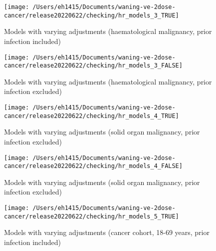 \documentclass[
  10,
]{article}
\begin{document}
\begin{landscape}
\begin{figure}[H]
{\centering \texttt{[image: /Users/eh1415/Documents/waning-ve-2dose-cancer/release20220622/checking/hr\_models\_3\_TRUE]} 

}

\caption{Models with varying adjustments (haematological malignancy, prior infection included)}\label{fig:unnamed-chunk-6}
\end{figure}

\begin{figure}[H]

{\centering \texttt{[image: /Users/eh1415/Documents/waning-ve-2dose-cancer/release20220622/checking/hr\_models\_3\_FALSE]} 

}

\caption{Models with varying adjustments (haematological malignancy, prior infection excluded)}\label{fig:unnamed-chunk-7}
\end{figure}

\begin{figure}[H]

{\centering \texttt{[image: /Users/eh1415/Documents/waning-ve-2dose-cancer/release20220622/checking/hr\_models\_4\_TRUE]} 

}

\caption{Models with varying adjustments (solid organ malignancy, prior infection excluded)}\label{fig:unnamed-chunk-8}
\end{figure}

\begin{figure}[H]

{\centering \texttt{[image: /Users/eh1415/Documents/waning-ve-2dose-cancer/release20220622/checking/hr\_models\_4\_FALSE]} 

}

\caption{Models with varying adjustments (solid organ malignancy, prior infection excluded)}\label{fig:unnamed-chunk-9}
\end{figure}

\begin{figure}[H]

{\centering \texttt{[image: /Users/eh1415/Documents/waning-ve-2dose-cancer/release20220622/checking/hr\_models\_5\_TRUE]} 

}

\caption{Models with varying adjustments (cancer cohort, 18-69 years, prior infection included)}\label{fig:unnamed-chunk-10}
\end{figure}

\begin{figure}[H]


\end{figure}
\end{landscape}
\end{document}
